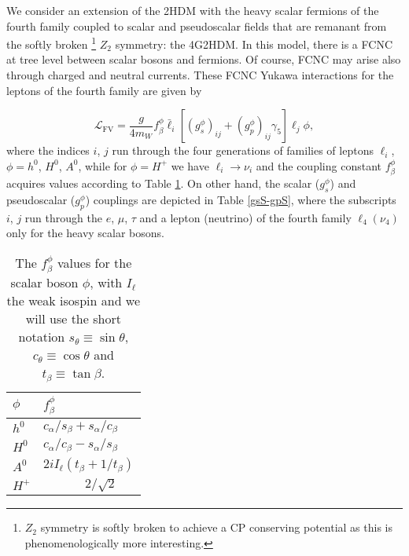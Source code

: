 \documentclass[a4paper]{jpconf}
\begin{document}
We consider an extension of the 2HDM with the heavy scalar fermions of the fourth family coupled to scalar and pseudoscalar fields that are remanant from the softly broken \footnote{$ Z_{2} $ symmetry is softly broken to achieve a CP conserving potential as this is phenomenologically more  interesting.} $Z_{2}$ symmetry: the 4G2HDM. In this model, there is a FCNC at tree level between scalar bosons and fermions. Of course, FCNC may arise also through charged and neutral currents. These FCNC Yukawa interactions for the leptons of the fourth family are given by

\begin{equation}
\mathcal{L}_{\mathrm{FV}}=\frac{g}{4m_{W}}f_\beta^\phi\bar{\ell}_{i}\left[\left(g_{s}^{\phi}\right)
 _{ij} +\left( g_{p}^{\phi}\right) _{ij} \gamma_{5} \right]
\ell_{j}\phi,
\label{Lagragian1}
\end{equation}
where the indices $ i $, $ j $  run through the four generations of families of leptons $ \ell_{i} $,  $\phi=h^0$, $H^0$, $A^0$, while for $\phi=H^+$ we have $\ell_i\to \nu_i$ and the coupling constant $f_\beta^\phi$ acquires values according to Table \ref{gs}. On other hand, the scalar ($g_{s}^{\phi}$) and pseudoscalar ($g_{p}^{\phi}$) couplings are depicted in Table \ref{gsS-gpS}, where the subscripts $i$, $j$ run through the $e$, $\mu$, $\tau$ and a lepton (neutrino) of the fourth family $ \ell_{4}(\nu_4)$ only for the heavy scalar bosons.

\begin{table}[htbp]
\begin{center}
\centering
\begin{tabular}{|l|l|}
\hline
 $\phi$ & \textbf{   } \textbf{   }\textbf{   }\textbf{   }\textbf{   }$ f_\beta^\phi $ \\
\hline
$ h^{0} $ & $c_{\alpha}/s_{\beta}+s_{\alpha}/c_{\beta}$   \\
\hline
$ H^{0} $ & $c_{\alpha}/c_{\beta}-s_{\alpha}/s_{\beta}$ \\
\hline
$ A^{0} $ & $ 2iI_{\ell}(t_{\beta}+ 1/t_{\beta}) $ \\
\hline
$ H^{+} $ &  $ \textbf{   } \textbf{   }\textbf{   }\textbf{   }\textbf{   }2/\sqrt{2}$ \\
\hline
\end{tabular}
\caption{The $f_\beta^\phi$ values for the scalar boson $\phi$, with  $ I_{\ell} $ the weak isospin and we will use the short notation $s_{\theta}\equiv\sin\theta$, $c_{\theta}\equiv \cos\theta$ and $t_{\beta}\equiv \tan\beta$.}
\label{gs}
\end{center}
\end{table}
\end{document}
